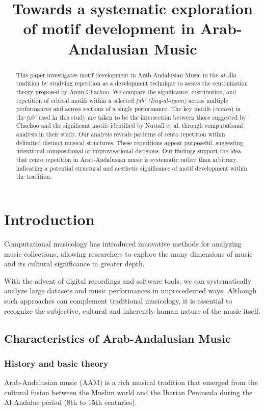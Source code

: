 \documentclass{article}
\title{Towards a systematic exploration of motif development in Arab-Andalusian Music}
\begin{document}
%
\maketitle
%
\begin{abstract}

This paper investigates motif development in Arab-Andalusian Music in the \textit{al-Āla} tradition by studying repetition as a development technique to assess the centonization theory proposed by Amin Chachoo. We compare the significance, distribution, and repetition of critical motifs within a selected \textit{ṭab‘ (Iraq-al-ayam)} across multiple performances and across sections of a single performance. The key motifs (\textit{centos}) in the \textit{ṭab‘} used in this study are taken to be the intersection between those suggested by Chachoo and the significant motifs identified by Nuttall et al. through computational analysis in their study. Our analysis reveals patterns of cento repetition within delimited distinct musical structures. These repetitions appear purposeful, suggesting intentional compositional or improvisational decisions. Our findings support the idea that cento repetition in Arab-Andalusian music is systematic rather than arbitrary, indicating a potential structural and aesthetic significance of motif development within the tradition.

\end{abstract}
%
\section{Introduction}\label{sec:introduction}
Computational musicology has introduced innovative methods for analyzing music collections, allowing researchers to explore the many dimensions of music and its cultural significance in greater depth. \cite{Tzanetakis2007}\cite{Gomez&Herrera2013}

With the advent of digital recordings and software tools, we can systematically analyze large datasets and music performances in unprecedented ways. Although such approaches can complement traditional musicology, it is essential to recognize the subjective, cultural and inherently human nature of the music itself.\cite{towards_the_compleat_musicologist?}\cite{Jorna2011}

\subsection{Characteristics of Arab-Andalusian Music}\label{sec:characteristics}
\subsubsection{History and basic theory}\label{sec:history}
Arab-Andalusian music (AAM) is a rich musical tradition that emerged from the cultural fusion between the Muslim world and the Iberian Peninsula during the Al-Andalus period (8th to 15th centuries).
\end{document}
